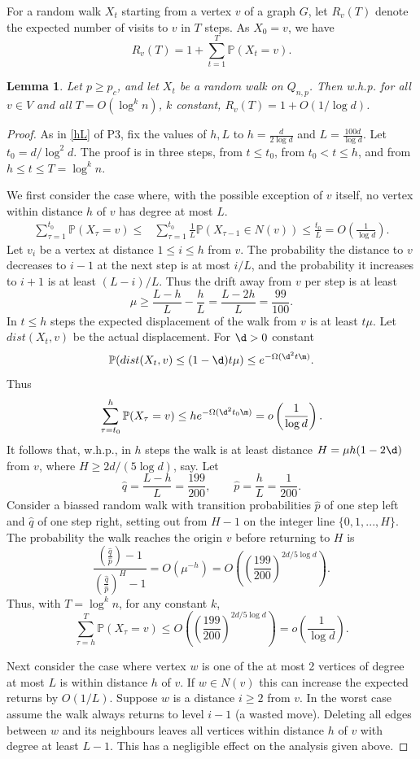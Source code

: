 \documentclass[12pt]{article}
\def\t{\tau} \def\om{\omega} \def\OM{\Omega} \def\Om{\Omega}\def\up{\upsilon}\def\U{\Upsilon}
\newtheorem{lemma}[theorem]{Lemma}
\newcommand{\wh}[1]{\widehat{#1}}
\newcommand{\brac}[1]{\left(#1\right)}
\newcommand{\bfrac}[2]{\left(\frac{#1}{#2}\right)}
\def\Pr{\mathbb{P}}
\begin{document}
For a random walk $X_t$ starting from a vertex $v$ of a graph $G$, let $R_v(T)$ denote the expected number of visits to $v$ in $T$ steps. As $X_0=v$, we have
\[
R_v(T)=1+ \sum_{t=1}^T \Pr(X_t=v).
\]
\begin{lemma}\label{RT}
Let $p \ge p_c$, and let $X_t$ be a random walk on $Q_{n,p}$. Then w.h.p. for all $v \in V$ and all $T =O(\log^k n)$, $k $ constant, $R_v(T)=1+O(1/\log d)$.
\end{lemma}
\begin{proof}
As in \eqref{hL} of P3, fix the values of $h,L$ to $h= \frac{d}{2 \log d}$ and $ L=  \frac {100d}{\log d}$.
Let $t_0=d/\log^2 d$.
The proof is in three steps, from $t \le  t_0$, from $t_0<t \le h$, and from $h \le t \le T=\log^k n$.

We first consider the case where, with the possible exception of $v$ itself, no vertex within distance $h$ of $v$ has degree at most $L$.
\begin{align*}
\sum_{\t=1}^{t_0} \Pr(X_\t=v) \le& \sum_{\t=1}^{t_0} \frac 1L \Pr(X_{\t-1}\in N(v))
\le \frac{t_0}{L} = O \bfrac 1{\log d}.
\end{align*}
Let $v_i$ be a vertex at distance $1 \le i \le h$ from $v$. The probability the distance to $v$ decreases to $i-1$ at the
next step is at most $i/L$, and the probability it increases to $i+1$ is at least $(L-i)/L$. Thus the drift
away from $v$ per step is at least
\[
\mu \ge \frac{L-h}{L}- \frac hL = \frac{L-2h}{L} = \frac{99}{100}.
\]
In $t \le h$ steps the expected displacement of the walk from $v$ is at least $t\mu$. Let $dist(X_t,v)$ be the
actual displacement. For $\d>0$ constant
\[
\Pr(dist(X_t,v)\le (1-\d)t \mu) \le e^{-\Omega(\d^2 t\m)}.
\]
Thus
\[
\sum_{\t=t_0}^h \Pr(X_\t=v) \le he^{-\Omega(\d^2 t_0\m)} =o\bfrac{1}{\log d}.
\]
It follows  that, w.h.p., in $h$ steps the walk is at least distance $H=\mu h(1-2\d)$ from $v$,
where $H \ge 2 d/(5 \log d)$, say. Let
\[
\wh q= \frac{L-h}{L}= \frac{199}{200}, \qquad \wh p= \frac hL= \frac 1{200}.
\]
Consider a biassed random walk  with transition probabilities $\wh p$ of one step left and $\wh q$ of one step right,
setting out from $H-1$ on the integer line $\{0,1,...,H\}$. The probability the walk reaches the origin $v$ before returning to $H$ is
\[
\frac{ \bfrac{\wh q}{\wh p}-1}{ \bfrac{\wh q}{\wh p}^H-1}=O(\mu^{-h})=O\brac{ \bfrac{199}{200}^{2d/5\log d}}.
\]
Thus, with $T=\log^k n$, for any constant $k$,
\[
\sum_{\t=h}^{T} \Pr(X_\t=v) \le O\brac{ \bfrac{199}{200}^{2d/5\log d}}=o\bfrac{1}{\log d}.
\]

Next consider the case where  vertex $w$ is one of the at most 2 vertices of degree at most $L$ is within distance $h$ of $v$.
If $w \in N(v)$ this can increase the expected returns by $O(1/L)$. Suppose $w$ is a distance $i\ge 2$ from $v$. In the worst case assume the walk always returns to level $i-1$ (a wasted move). Deleting all edges between $w$ and its neighbours leaves all vertices within distance $h$ of $v$ with degree at least $L-1$. This has a negligible effect on the analysis given above.
\end{proof}
\end{document}
